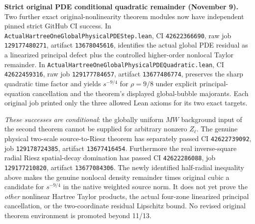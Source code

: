 \documentclass[11pt]{amsart}
\begin{document}
\medskip
\noindent\textbf{Strict original PDE conditional quadratic remainder (November 9).}
Two further exact original-nonlinearity theorem modules now have
independent pinned strict GitHub CI success. In
\texttt{ActualHartreeOneGlobalPhysicalPDEStep.lean},
CI \texttt{42622366690}, raw job \texttt{129177480271},
artifact \texttt{13678045616}, identifies the actual global
PDE residual as a linearized principal defect plus the controlled
higher-order nonlocal Taylor remainder. In
\texttt{ActualHartreeOneGlobalPhysicalPDEQuadratic.lean},
CI \texttt{42622459316}, raw job \texttt{129177784657},
artifact \texttt{13677486774}, preserves the sharp quadratic
time factor and yields $s^{-9/4}$ for $\rho=9/8$ under explicit
principal-equation cancellation and the theorem's displayed
global-bubble majorants. Each original job printed only the
three allowed Lean axioms for its two exact targets.

\emph{These successes are conditional}: the globally
uniform $MW$ background input of the second theorem
cannot be supplied for arbitrary nonzero $Z_\ell$.
The genuine physical two-scale source-to-Riesz theorem has
separately passed CI \texttt{42622739092},
job \texttt{129178724385}, artifact \texttt{13677416454}.
Furthermore the real inverse-square radial Riesz spatial-decay
domination has passed CI \texttt{42622286088},
job \texttt{129177210820}, artifact \texttt{13677084306}.
The newly identified half-radial inequality above makes the
genuine nonlocal density remainder times original cubic a
candidate for $s^{-9/4}$ in the native weighted source norm.
It does not yet prove the \emph{other} nonlinear Hartree Taylor
products, the actual four-zone linearized principal cancellation,
or the two-coordinate residual Lipschitz bound.
No revised original theorem environment is promoted beyond 11/13.
\end{document}
